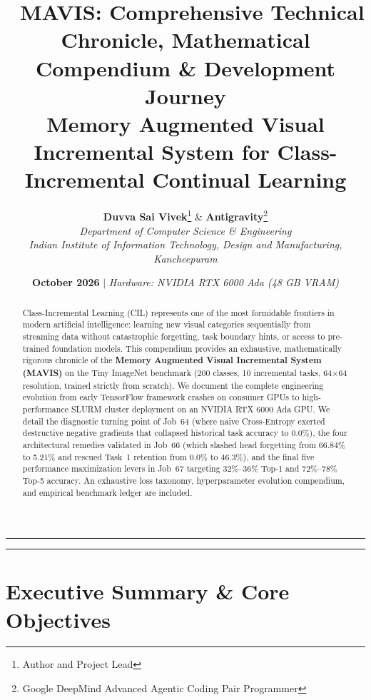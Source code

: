 \documentclass[11pt,a4paper]{article}
\title{\textbf{\LARGE 🧠 MAVIS: Comprehensive Technical Chronicle, Mathematical Compendium \& Development Journey}\\[0.4em]
    \large Memory Augmented Visual Incremental System for Class-Incremental Continual Learning}
\author{
        \textbf{Duvva Sai Vivek}\thanks{Author and Project Lead} \quad \& \quad \textbf{Antigravity}\thanks{Google DeepMind Advanced Agentic Coding Pair Programmer}\\
        \textit{Department of Computer Science \& Engineering}\\
        \textit{Indian Institute of Information Technology, Design and Manufacturing, Kancheepuram}
    }
\date{\textbf{October 2026} \quad $\vert$ \quad \textit{Hardware: NVIDIA RTX 6000 Ada (48 GB VRAM)}}
\begin{document}
    \maketitle

    \begin{abstract}
    Class-Incremental Learning (CIL) represents one of the most formidable frontiers in modern artificial intelligence: learning new visual categories sequentially from streaming data without catastrophic forgetting, task boundary hints, or access to pre-trained foundation models. This compendium provides an exhaustive, mathematically rigorous chronicle of the \textbf{Memory Augmented Visual Incremental System (MAVIS)} on the Tiny ImageNet benchmark (200 classes, 10 incremental tasks, 64$\times$64 resolution, trained strictly from scratch). We document the complete engineering evolution from early TensorFlow framework crashes on consumer GPUs to high-performance SLURM cluster deployment on an NVIDIA RTX 6000 Ada GPU. We detail the diagnostic turning point of Job~64 (where naive Cross-Entropy exerted destructive negative gradients that collapsed historical task accuracy to 0.0\%), the four architectural remedies validated in Job~66 (which slashed head forgetting from 66.84\% to 5.21\% and rescued Task~1 retention from 0.0\% to 46.3\%), and the final five performance maximization levers in Job~67 targeting 32\%--36\% Top-1 and 72\%--78\% Top-5 accuracy. An exhaustive loss taxonomy, hyperparameter evolution compendium, and empirical benchmark ledger are included.
    \end{abstract}

    \vspace{1em}
    \hrule
    \vspace{1em}

    \tableofcontents

    \vspace{1.5em}
    \hrule
    \vspace{1.5em}

    \newpage

    \section{Executive Summary \& Core Objectives}
    \label{sec:executive-summary}
\end{document}
